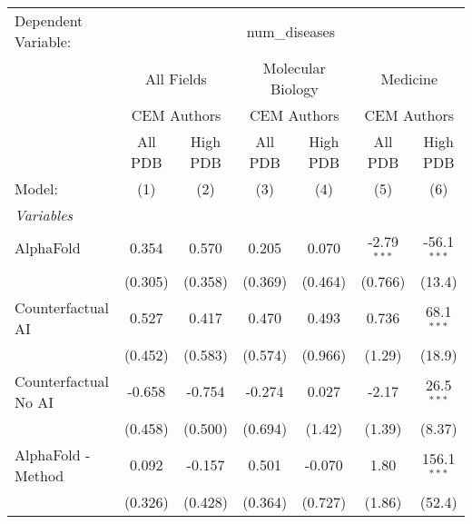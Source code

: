 \begingroup
\centering
\begin{tabular}{lcccccc}
   \tabularnewline \midrule \midrule
   Dependent Variable: & \multicolumn{6}{c}{num\_diseases}\\
 & \multicolumn{2}{c}{All Fields} & \multicolumn{2}{c}{Molecular Biology} & \multicolumn{2}{c}{Medicine} \\
\cmidrule(lr){2-3} \cmidrule(lr){4-5} \cmidrule(lr){6-7}
 & \multicolumn{2}{c}{CEM Authors} & \multicolumn{2}{c}{CEM Authors} & \multicolumn{2}{c}{CEM Authors} \\
\cmidrule(lr){2-3} \cmidrule(lr){4-5} \cmidrule(lr){6-7}
 & \multicolumn{1}{c}{All PDB} & \multicolumn{1}{c}{High PDB} & \multicolumn{1}{c}{All PDB} & \multicolumn{1}{c}{High PDB} & \multicolumn{1}{c}{All PDB} & \multicolumn{1}{c}{High PDB} \\
\cmidrule(lr){2-2} \cmidrule(lr){3-3} \cmidrule(lr){4-4} \cmidrule(lr){5-5} \cmidrule(lr){6-6} \cmidrule(lr){7-7}
   Model:                                                     & (1)     & (2)          & (3)          & (4)       & (5)           & (6)\\  
   \midrule
   \emph{Variables}\\
   AlphaFold                                                  & 0.354   & 0.570        & 0.205        & 0.070     & -2.79$^{***}$ & -56.1$^{***}$\\   
                                                              & (0.305) & (0.358)      & (0.369)      & (0.464)   & (0.766)       & (13.4)\\   
   Counterfactual AI                                          & 0.527   & 0.417        & 0.470        & 0.493     & 0.736         & 68.1$^{***}$\\   
                                                              & (0.452) & (0.583)      & (0.574)      & (0.966)   & (1.29)        & (18.9)\\   
   Counterfactual No AI                                       & -0.658  & -0.754       & -0.274       & 0.027     & -2.17         & 26.5$^{***}$\\   
                                                              & (0.458) & (0.500)      & (0.694)      & (1.42)    & (1.39)        & (8.37)\\   
   AlphaFold - Method                                         & 0.092   & -0.157       & 0.501        & -0.070    & 1.80          & 156.1$^{***}$\\   
                                                              & (0.326) & (0.428)      & (0.364)      & (0.727)   & (1.86)        & (52.4)\\   

\end{tabular}
